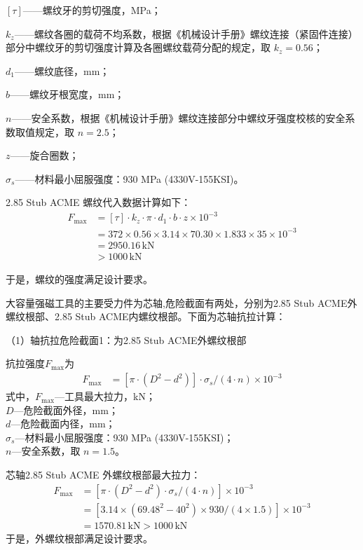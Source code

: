 $[\tau]$——螺纹牙的剪切强度，MPa；

$k_z$——螺纹各圈的载荷不均系数，根据《机械设计手册》螺纹连接（紧固件连接）部分中螺纹牙的剪切强度计算及各圈螺纹载荷分配的规定\cite{ref26}，取 $k_z = 0.56$；

$d_1$——螺纹底径，mm；

$b$——螺纹牙根宽度，mm；

$n$——安全系数，根据《机械设计手册》螺纹连接部分中螺纹牙强度校核的安全系数取值规定\cite{ref26}，取 $n = 2.5$；

$z$——旋合圈数；

$\sigma_s$——材料最小屈服强度：930 MPa (4330V-155KSI)。


2.85 Stub ACME 螺纹代入数据计算如下：
\begin{align}
    F_{\max} &= [\tau] \cdot k_z \cdot \pi \cdot d_1 \cdot b \cdot z \times 10^{-3} \\
             &= 372 \times 0.56 \times 3.14 \times 70.30 \times 1.833 \times 35 \times 10^{-3} \\
             &= 2950.16 \, \text{kN} \\
             &> 1000 \, \text{kN}
\end{align}

于是，螺纹的强度满足设计要求。

大容量强磁工具的主要受力件为芯轴,危险截面有两处，分别为2.85 Stub ACME外螺纹根部、2.85 Stub ACME内螺纹根部。下面为芯轴抗拉计算：

（1）轴抗拉危险截面1：为2.85 Stub ACME外螺纹根部

抗拉强度$F_{\max}$为
\begin{align}
    F_{\max} &= \left[\pi \cdot (D^2 - d^2)\right] \cdot \sigma_s / (4 \cdot n) \times 10^{-3}
\end{align}
式中，$F_{\max}$---工具最大拉力，kN；\\
$D$---危险截面外径，mm；\\
$d$---危险截面内径，mm；\\
$\sigma_s$---材料最小屈服强度：930 MPa (4330V-155KSI)；\\
$n$---安全系数，取 $n = 1.5$。

芯轴2.85 Stub ACME 外螺纹根部最大拉力：
\begin{align}
    F_{\max} &= \left[\pi \cdot (D^2 - d^2) \cdot \sigma_s / (4 \cdot n)\right] \times 10^{-3} \\
             &= \left[3.14 \times (69.48^2 - 40^2) \times 930 / (4 \times 1.5)\right] \times 10^{-3} \\
             &= 1570.81 \, \text{kN} > 1000 \, \text{kN}
\end{align}
于是，外螺纹根部满足设计要求。

